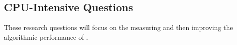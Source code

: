 

\subsection{{\bf CPU-Intensive} Questions} These research questions will focus on the measuring and then improving the algorithmic performance of \IT.

